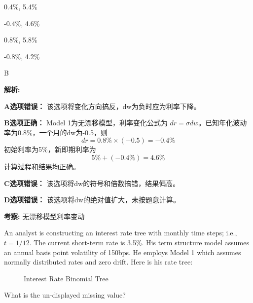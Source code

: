 \documentclass{article}
\newcounter{question} %
\newenvironment{explanation}
{\textbf{解析:}\par}
{\par}
\newcommand{\checklist}[1]{
    \textbf{考察:} #1 \par %
    \addcontentsline{toc}{subsection}{题号\thequestion 考察: #1} %
    \vspace{2em} %
}
\begin{document}
\begin{choices}
    \item 0.4\%, 5.4\%
    \item -0.4\%, 4.6\%
    \item 0.8\%, 5.8\%
    \item -0.8\%, 4.2\%
\end{choices}

\begin{correctanswer}
    B
\end{correctanswer}

\begin{explanation}
    \textbf{A选项错误：} 该选项将变化方向搞反，dw为负时应为利率下降。

    \textbf{B选项正确：} Model 1为无漂移模型，利率变化公式为 \( dr = \sigma dw \)。已知年化波动率为0.8\%，一个月的dw为-0.5，则
    \[
    dr = 0.8\% \times (-0.5) = -0.4\%
    \]
    初始利率为5\%，新即期利率为
    \[
    5\% + (-0.4\%) = 4.6\%
    \]
    计算过程和结果均正确。

    \textbf{C选项错误：} 该选项将dw的符号和倍数搞错，结果偏高。

    \textbf{D选项错误：} 该选项将dw的绝对值扩大，未按题意计算。
\end{explanation}
\checklist{无漂移模型利率变动}

\begin{question}
    An analyst is constructing an interest rate tree with monthly time steps; i.e., \( t = 1/12 \). The current short-term rate is 3.5\%. His term structure model assumes an annual basis point volatility of 150bps. He employs Model 1 which assumes normally distributed rates and zero drift. Here is his rate tree:

    \begin{figure}[H]
        \centering
        \caption{Interest Rate Binomial Tree}
    \end{figure}

    What is the un-displayed missing value?
\end{question}
\end{document}

